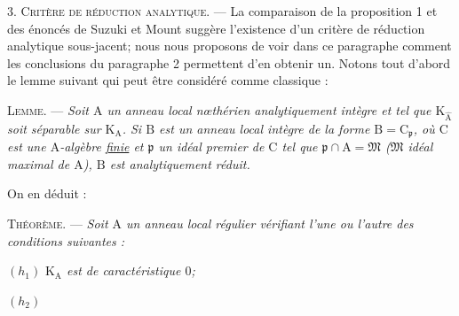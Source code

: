 3. \textsc{Critère de réduction analytique.} --- La comparaison de la proposition 1 et des énoncés de Suzuki et Mount suggère l’existence d’un critère de réduction analytique sous-jacent; nous nous proposons de voir dans ce paragraphe comment les conclusions du paragraphe 2 permettent d’en obtenir un. Notons tout d’abord le lemme suivant qui peut être considéré comme classique :

\textsc{Lemme.} --- \textit{Soit $\mathrm A$ un anneau local nœthérien analytiquement intègre et tel que $\mathrm K_{\widehat{\mathrm A}}$ soit séparable sur $\mathrm K_{\mathrm A}$. Si $\mathrm B$ est un anneau local intègre de la forme $\mathrm B=\mathrm C_{\mathfrak p}$, où $\mathrm C$ est une $\mathrm A$-algèbre \uline{finie} et $\mathfrak p$ un idéal premier de $\mathrm C$ tel que $\mathfrak p\cap\mathrm A=\mathfrak M$ ($\mathfrak M$ idéal maximal de $\mathrm A$), $\mathrm B$ est analytiquement réduit.}

On en déduit :

\textsc{Théorème.} --- \textit{Soit $\mathrm A$ un anneau local régulier vérifiant l’une ou l’autre des conditions suivantes :}

$(h_1)$ \textit{$\mathrm K_{\mathrm A}$ est de caractéristique $0$;}

$(h_2)$ 
